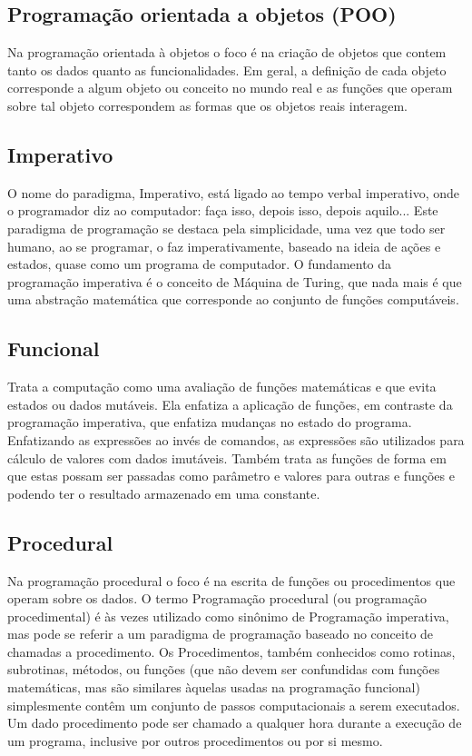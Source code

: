 \documentclass[12pt]{article}
\begin{document}
\subsection{Programação orientada a objetos (POO) }
Na programação orientada à objetos o foco é na criação de objetos que contem tanto os dados quanto as funcionalidades. Em geral, a definição de cada objeto corresponde a algum objeto ou conceito no mundo real e as funções que operam sobre tal objeto correspondem as formas que os objetos reais interagem.


\subsection{Imperativo}

O nome do paradigma, Imperativo, está ligado ao tempo verbal imperativo, onde o programador diz ao computador: faça isso, depois isso, depois aquilo... Este paradigma de programação se destaca pela simplicidade, uma vez que todo ser humano, ao se programar, o faz imperativamente, baseado na ideia de ações e estados, quase como um programa de computador.
O fundamento da programação imperativa é o conceito de Máquina de Turing, que nada mais é que uma abstração matemática que corresponde ao conjunto de funções computáveis.

\subsection{Funcional}

Trata a computação como uma avaliação de funções matemáticas e que evita estados ou dados mutáveis. Ela enfatiza a aplicação de funções, em contraste da programação imperativa, que enfatiza mudanças no estado do programa. Enfatizando as expressões ao invés de comandos, as expressões são utilizados para cálculo de valores com dados imutáveis. Também trata as funções de forma em que estas possam ser passadas como parâmetro e valores para outras e funções e podendo ter o resultado armazenado em uma constante.

\subsection{Procedural}
Na programação procedural o foco é na escrita de funções ou procedimentos que operam sobre os dados. O termo Programação procedural (ou programação procedimental) é às vezes utilizado como sinônimo de Programação imperativa, mas pode se referir a um paradigma de programação baseado no conceito de chamadas a procedimento. Os Procedimentos, também conhecidos como rotinas, subrotinas, métodos, ou funções (que não devem ser confundidas com funções matemáticas, mas são similares àquelas usadas na programação funcional) simplesmente contêm um conjunto de passos computacionais a serem executados. Um dado procedimento pode ser chamado a qualquer hora durante a execução de um programa, inclusive por outros procedimentos ou por si mesmo.
\end{document}

